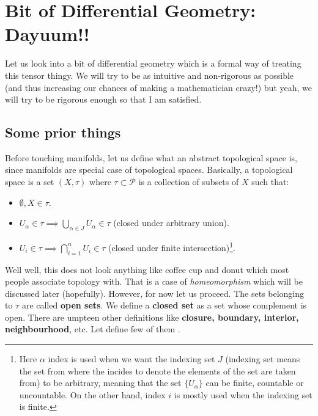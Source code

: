 \section{Bit of  Differential Geometry: Dayuum!!}
Let us look into a bit of differential geometry which is a formal way of treating this tensor thingy. We will try to be as intuitive and non-rigorous as possible (and thus increasing our chances of making a mathematician crazy!) but yeah, we will try to be rigorous enough so that I am satisfied.
\subsection{Some prior things}
Before touching manifolds, let us define what an abstract topological space is, since manifolds are special case of topological spaces. Basically, a topological space is a set $(X, \tau )$ where $\tau \subset \mathcal{P}$ is a collection of subsets of $X$ such that:
\begin{itemize}
    \item $\emptyset, X \in \tau$.
    \item $U_\alpha \in \tau \implies \bigcup \limits_{\alpha\in J} U_\alpha \in \tau$  (closed under arbitrary union).
    \item $U_i \in \tau \implies \bigcap \limits_{i=1}^n U_i \in \tau$  (closed under finite intersection)\footnote{Here $\alpha$ index is used when we want the indexing set $J$ (indexing set means the set from where the incides to denote the elements of the set are taken from) to be arbitrary, meaning that the set $\{U_\alpha\}$ can be finite, countable or uncountable. On the other hand, index $i$ is mostly used when the indexing set is finite.}.
\end{itemize}
Well well, this does not look anything like coffee cup and donut which most people associate topology with. That is a case of \textit{homeomorphism} which will be discussed later (hopefully). However, for now let us proceed. The sets belonging to $\tau$ are called \textbf{open sets}. We define a \textbf{closed set} as a set whose complement is open. There are umpteen other definitions like \textbf{closure, boundary, interior, neighbourhood}, etc. Let define few of them . 
